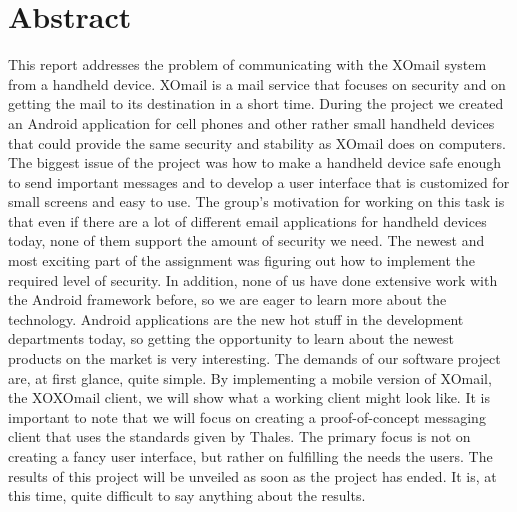
\chapter*{Abstract}

This report addresses the problem of communicating with the XOmail system from a handheld device. XOmail is a mail service that focuses on security and on getting the mail to its destination in a short time. During the project we created an Android application for cell phones and other rather small handheld devices that could provide the same security and stability as XOmail does on computers. The biggest issue of the project was how to make a handheld device safe enough to send important messages and to develop a user interface that is customized for small screens and easy to use. 
\newline
\newline
The group’s motivation for working on this task is that even if there are a lot of different email applications for handheld devices today, none of them support the amount of security we need. The newest and most exciting part of the assignment was figuring out how to implement the required level of security. In addition, none of us have done extensive work with the Android framework before, so we are eager to learn more about the technology. Android applications are the new hot stuff in the development departments today, so getting the opportunity to learn about the newest products on the market is very interesting. 
\newline
\newline
The demands of our software project are, at first glance, quite simple. By implementing a mobile version of XOmail, the XOXOmail client, we will show what a working client might look like. It is important to note that we will focus on creating a proof-of-concept messaging client that uses the standards given by Thales. The primary focus is not on creating a fancy user interface, but rather on fulfilling the needs the users. 
\newline
\newline
The results of this project will be unveiled as soon as the project has ended. It is, at this time, quite difficult to say anything about the results.

